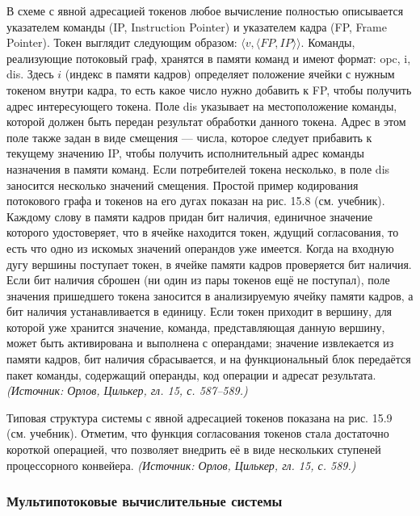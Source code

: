\documentclass[a4paper,12pt]{article}
\begin{document}
В схеме с явной адресацией токенов любое вычисление полностью описывается указателем команды (IP, Instruction Pointer) и указателем кадра (FP, Frame Pointer). Токен выглядит следующим образом: \(\langle v, \langle FP, IP \rangle \rangle\). Команды, реализующие потоковый граф, хранятся в памяти команд и имеют формат: opc, i, dis. Здесь \(i\) (индекс в памяти кадров) определяет положение ячейки с нужным токеном внутри кадра, то есть какое число нужно добавить к FP, чтобы получить адрес интересующего токена. Поле dis указывает на местоположение команды, которой должен быть передан результат обработки данного токена. Адрес в этом поле также задан в виде смещения — числа, которое следует прибавить к текущему значению IP, чтобы получить исполнительный адрес команды назначения в памяти команд. Если потребителей токена несколько, в поле dis заносится несколько значений смещения. Простой пример кодирования потокового графа и токенов на его дугах показан на рис. 15.8 (см. учебник). Каждому слову в памяти кадров придан бит наличия, единичное значение которого удостоверяет, что в ячейке находится токен, ждущий согласования, то есть что одно из искомых значений операндов уже имеется. Когда на входную дугу вершины поступает токен, в ячейке памяти кадров проверяется бит наличия. Если бит наличия сброшен (ни один из пары токенов ещё не поступал), поле значения пришедшего токена заносится в анализируемую ячейку памяти кадров, а бит наличия устанавливается в единицу. Если токен приходит в вершину, для которой уже хранится значение, команда, представляющая данную вершину, может быть активирована и выполнена с операндами; значение извлекается из памяти кадров, бит наличия сбрасывается, и на функциональный блок передаётся пакет команды, содержащий операнды, код операции и адресат результата.
\textit{(Источник: Орлов, Цилькер, гл. 15, с. 587--589.)}

Типовая структура системы с явной адресацией токенов показана на рис. 15.9 (см. учебник). Отметим, что функция согласования токенов стала достаточно короткой операцией, что позволяет внедрить её в виде нескольких ступеней процессорного конвейера.
\textit{(Источник: Орлов, Цилькер, гл. 15, с. 589.)}

\subsubsection{Мультипотоковые вычислительные системы}
\end{document}
